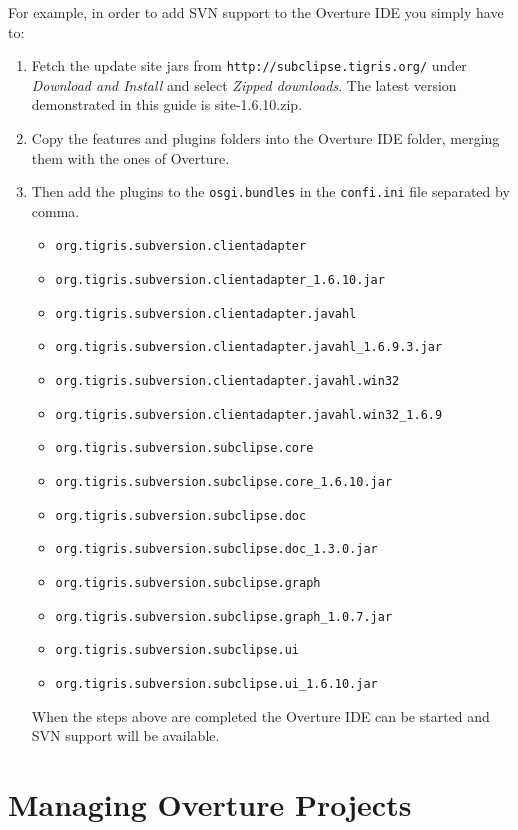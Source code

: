 \documentclass{overturerepchap}
\newcommand{\url}[1]{\texttt{#1}}
\begin{document}
For example, in order to add SVN support to the Overture IDE you simply have to:
\begin{enumerate}
\item Fetch the update site jars from \url{http://subclipse.tigris.org/} under \emph{Download and Install} and select \emph{Zipped downloads}. The latest version demonstrated in this guide is site-1.6.10.zip.
\item Copy the features and plugins folders into the Overture IDE folder, merging them with the ones of Overture. 
\item Then add the plugins to the \texttt{osgi.bundles} in the \texttt{confi.ini} file separated by comma.
\begin{itemize}
\item \url{org.tigris.subversion.clientadapter}
\item \url{org.tigris.subversion.clientadapter\_1.6.10.jar}
\item \url{org.tigris.subversion.clientadapter.javahl}
\item \url{org.tigris.subversion.clientadapter.javahl\_1.6.9.3.jar}
\item \url{org.tigris.subversion.clientadapter.javahl.win32}
\item \url{org.tigris.subversion.clientadapter.javahl.win32\_1.6.9}
\item \url{org.tigris.subversion.subclipse.core}
\item \url{org.tigris.subversion.subclipse.core\_1.6.10.jar}
\item \url{org.tigris.subversion.subclipse.doc}
\item \url{org.tigris.subversion.subclipse.doc\_1.3.0.jar}
\item \url{org.tigris.subversion.subclipse.graph}
\item \url{org.tigris.subversion.subclipse.graph\_1.0.7.jar}
\item \url{org.tigris.subversion.subclipse.ui}
\item \url{org.tigris.subversion.subclipse.ui\_1.6.10.jar}
\end{itemize}
When the steps above are completed the Overture IDE can be started and SVN support will be available.
\end{enumerate}

\chapter{Managing Overture Projects}\label{sec:projects}
\end{document}
